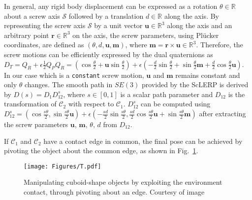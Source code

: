 \documentclass{article}
\begin{document}
In general, any rigid body displacement can be expressed as a rotation $\theta \in \mathbb{R}$ about a screw axis $\mathcal{S}$ followed by a translation $d \in \mathbb{R}$ along the axis. By representing the screw axis $\mathcal{S}$ by a unit vector $\boldsymbol{u} \in \mathbb{R}^3$ along the axis and an arbitrary point $\boldsymbol{r} \in \mathbb{R}^3$ on the axis, the screw parameters, using Plücker coordinates, are defined as $(\theta,d,\boldsymbol{u},\boldsymbol{m})$, where $\boldsymbol{m}= \boldsymbol{r} \times \boldsymbol{u} \in \mathbb{R}^3$. Therefore, the screw motions can be efficiently expressed by the dual quaternions as $ D_T = Q_R + \epsilon \frac{1}{2} Q_P Q_R =( \cos\frac{\theta}{2} + \boldsymbol{u}\sin\frac{\theta}{2}) + \epsilon\left(-\frac{d}{2}\sin\frac{\theta}{2}+\sin\frac{\theta}{2}\boldsymbol{m}+\frac{d}{2}\cos\frac{\theta}{2}\boldsymbol{u}\right)$. In our case which is a \texttt{constant} screw motion, $\boldsymbol{u}$ and $\boldsymbol{m}$ remains constant and only $\theta$ changes.  The smooth path in $SE(3)$ provided by the ScLERP is derived by $D(s) = D_1D_{12}^{s}$, where $s \in [0, 1]$ is a scalar path parameter and $D_{12}$ is the transformation of $\mathcal{C}_2$ with respect to $\mathcal{C}_1$. $D_{12}^ {s}$ can be computed using $D_{12}^{s} = \left(\cos \frac{s \theta}{2}, \sin \frac{s\theta}{2}\boldsymbol{u}\right) + \epsilon \left(- \frac{s d}{2} \sin \frac{s \theta}{2}, \frac{s d}{2}\cos \frac{s \theta}{2} \boldsymbol{u} + \sin \frac{s \theta}{2} \boldsymbol{m}\right)$ after extracting the screw parameters $\boldsymbol{u}$, $\boldsymbol{m}$, $\theta$, $d$ from $D_{12}$.

If $\mathcal{C}_1$ and $\mathcal{C}_2$ have a contact edge in common, the final pose can be achieved by pivoting the object about the common edge, as shown in Fig.~\ref{Fig:SRP}. 

\begin{figure}[!htbp]
    \centering
    {\texttt{[image: Figures/T.pdf]}\label{Fig:SRP_T}}
    \caption{Manipulating cuboid-shape objects by exploiting the environment contact, through pivoting about an edge. Courtesy of image~\cite{Fakhari2020MotionAF}}
\label{Fig:SRP}
\end{figure}
\end{document}
